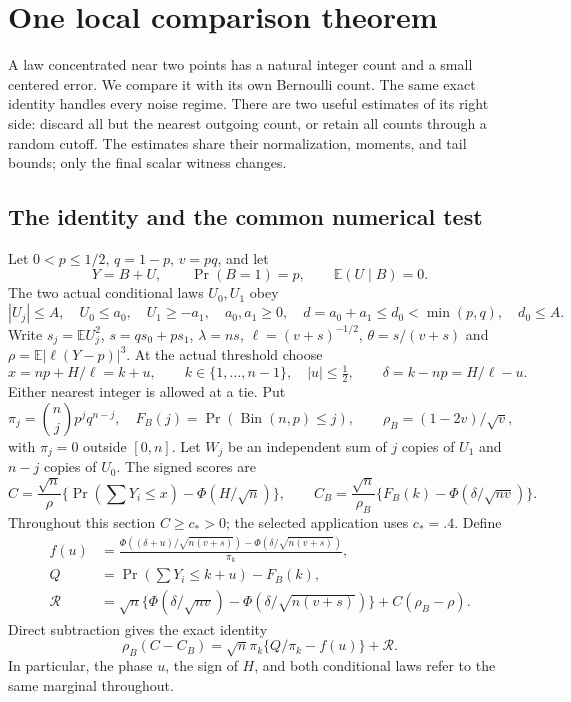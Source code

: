 \section{One local comparison theorem}\label{shortloc:section}

A law concentrated near two points has a natural integer count and a small
centered error. We compare it with its own Bernoulli count. The same exact
identity handles every noise regime. There are two useful estimates of its
right side: discard all but the nearest outgoing count, or retain all counts
through a random cutoff. The estimates share their normalization, moments,
and tail bounds; only the final scalar witness changes.

\subsection{The identity and the common numerical test}

Let $0<p\le1/2$, $q=1-p$, $v=pq$, and let
\[
 Y=B+U,\qquad \Pr(B=1)=p,\qquad \mathbb E(U\mid B)=0.
\]
The two actual conditional laws $U_0,U_1$ obey
\begin{equation}\label{shortloc:support}
 |U_j|\le A,\quad U_0\le a_0,\quad U_1\ge-a_1,\quad
 a_0,a_1\ge0,\quad d=a_0+a_1\le d_0<\min(p,q),\quad d_0\le A.
\end{equation}
Write $s_j=\mathbb E U_j^2$, $s=qs_0+ps_1$, $\lambda=ns$,
$\ell=(v+s)^{-1/2}$, $\theta=s/(v+s)$ and
$\rho=\mathbb E|\ell(Y-p)|^3$. At the actual threshold choose
\[
 x=np+H/\ell=k+u,\qquad k\in\{1,\ldots,n-1\},\quad |u|\le\tfrac12,
 \qquad \delta=k-np=H/\ell-u.
\]
Either nearest integer is allowed at a tie. Put
\[
 \pi_j=\binom njp^jq^{n-j},\quad F_B(j)=\Pr(\operatorname{Bin}(n,p)\le j),
 \qquad \rho_B=(1-2v)/\sqrt v,
\]
with $\pi_j=0$ outside $[0,n]$. Let $W_j$ be an independent sum of $j$
copies of $U_1$ and $n-j$ copies of $U_0$. The signed scores are
\[
 C=\frac{\sqrt n}{\rho}\{\Pr(\textstyle\sum Y_i\le x)-\Phi(H/\sqrt n)\},
 \qquad C_B=\frac{\sqrt n}{\rho_B}\{F_B(k)-\Phi(\delta/\sqrt{nv})\}.
\]
Throughout this section $C\ge c_*>0$; the selected application uses $c_*=.4$.
Define
\begin{align}
 f(u)&=\frac{\Phi((\delta+u)/\sqrt{n(v+s)})-
                    \Phi(\delta/\sqrt{n(v+s)})}{\pi_k},\label{shortloc:f}\\
 Q&=\Pr(\textstyle\sum Y_i\le k+u)-F_B(k),\nonumber\\
 \mathcal R&=\sqrt n\{\Phi(\delta/\sqrt{nv})-
                 \Phi(\delta/\sqrt{n(v+s)})\}+C(\rho_B-\rho).\nonumber
\end{align}
Direct subtraction gives the exact identity
\begin{equation}\label{shortloc:master}
 \rho_B(C-C_B)=\sqrt n\pi_k\{Q/\pi_k-f(u)\}+\mathcal R.
\end{equation}
In particular, the phase $u$, the sign of $H$, and both conditional laws
refer to the same marginal throughout.

